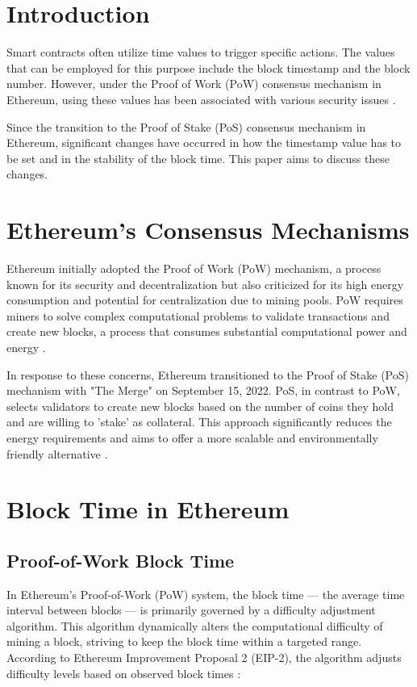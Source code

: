 \section{Introduction}

Smart contracts often utilize time values to trigger specific actions. The
values that can be employed for this purpose include the block timestamp and
the block number. However, under the Proof of Work (PoW) consensus mechanism in
Ethereum, using these values has been associated with various security issues
\cite{swc116} \cite{Conkas2021} \cite{DASP2018} \cite{Osiris2018}
\cite{Oyente2016}.


Since the transition to the Proof of Stake (PoS) consensus mechanism in
Ethereum, significant changes have occurred in how the timestamp value has to
be set and in the stability of the block time. This paper aims to discuss these
changes.

\section{Ethereum's Consensus Mechanisms}
Ethereum initially adopted the Proof of Work (PoW) mechanism, a process known
for its security and decentralization but also criticized for its high energy
consumption and potential for centralization due to mining pools. PoW requires
miners to solve complex computational problems to validate transactions and
create new blocks, a process that consumes substantial computational power and
energy \cite{eth_pow}.

In response to these concerns, Ethereum transitioned to the Proof of Stake
(PoS) mechanism with "The Merge" on September 15, 2022. PoS, in contrast to
PoW, selects validators to create new blocks based on the number of coins they
hold and are willing to 'stake' as collateral. This approach significantly
reduces the energy requirements and aims to offer a more scalable and
environmentally friendly alternative \cite{eth_merge}.


\section{Block Time in Ethereum}

\subsection{Proof-of-Work Block Time}

In Ethereum's Proof-of-Work (PoW) system, the block time — the average time
interval between blocks — is primarily governed by a difficulty adjustment
algorithm. This algorithm dynamically alters the computational difficulty of
mining a block, striving to keep the block time within a targeted range.
According to Ethereum Improvement Proposal 2 (EIP-2), the algorithm adjusts
difficulty levels based on observed block times \cite{eip-2}:

